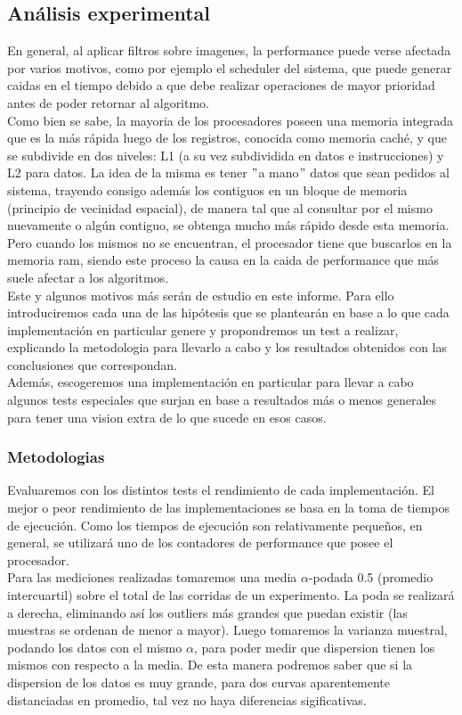 \subsection{Análisis experimental}

En general, al aplicar filtros sobre imagenes, la performance puede verse afectada por varios motivos, como por ejemplo el scheduler del sistema, que puede generar caidas en el tiempo debido a que debe realizar operaciones de mayor prioridad antes de poder retornar al algoritmo.\\

Como bien se sabe, la mayoria de los procesadores poseen una memoria integrada que es la más rápida luego de los registros, conocida como memoria caché, y que se subdivide en dos niveles: L1 (a su vez subdividida en datos e instrucciones) y L2 para datos. 
La idea de la misma es tener $"$a mano$"$ datos que sean pedidos al sistema, trayendo consigo además los contiguos en un bloque de memoria (principio de vecinidad espacial), de manera tal que al consultar por el mismo nuevamente o algún contiguo, se obtenga mucho más rápido desde esta memoria. Pero cuando los mismos no se encuentran, el procesador tiene que buscarlos en la memoria ram, siendo este proceso la causa en la caida de performance que más suele afectar a los algoritmos.\\ 

Este y algunos motivos más serán de estudio en este informe. Para ello introduciremos cada una de las hipótesis que se plantearán en base a lo que cada implementación en particular genere y propondremos un test a realizar, explicando la metodologia para llevarlo a cabo y los resultados obtenidos con las conclusiones que correspondan.\\
 
Además, escogeremos una implementación en particular para llevar a cabo algunos tests especiales que surjan en base a resultados más o menos generales para tener una vision extra de lo que sucede en esos casos.\\

\subsubsection{Metodologias}

Evaluaremos con los distintos tests el rendimiento de cada implementación. El mejor o peor rendimiento de las implementaciones se basa en la toma de tiempos de ejecución. Como los tiempos de ejecución son relativamente pequeños, en general, se utilizará uno de los contadores de performance que posee el procesador. \\
Para las mediciones realizadas tomaremos una media $\alpha$-podada 0.5 (promedio intercuartil) sobre el total de las corridas de un experimento. La poda se realizará a derecha, eliminando así los outliers más grandes que puedan existir (las muestras se ordenan de menor a mayor). Luego tomaremos la varianza muestral, podando los datos con el mismo $\alpha$, para poder medir que dispersion tienen los mismos con respecto a la media. 
De esta manera podremos saber que si la dispersion de los datos es muy grande, para dos curvas aparentemente distanciadas en promedio, tal vez no haya diferencias sigificativas.

